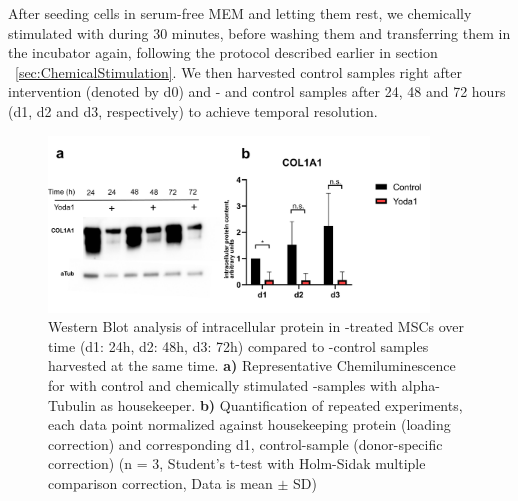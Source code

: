 After seeding cells in serum-free MEM\textalpha{} and letting them rest, we chemically stimulated \Piezo{} with \Yoda{} during 30 minutes, before washing them and transferring them in the incubator again, following the protocol described earlier in section ~\vref{sec:ChemicalStimulation}. We then harvested control samples right after intervention (denoted by d0) and \Yoda{}- and control samples after 24, 48 and 72 hours (d1, d2 and d3, respectively) to achieve temporal resolution. \par

\begin{figure}[htbp]
	\centering
	\includegraphics[width = 0.9\textwidth]{NormalYodaExp_WesternBlot_Col1a1.png}
	\caption{ Western Blot analysis of intracellular protein in \Yoda{}-treated MSCs over time (d1: 24h, d2: 48h, d3: 72h) compared to \Yoda{}-control samples harvested at the same time.
		\textbf{a)} Representative Chemiluminescence for \colone with control and chemically stimulated \Piezo{}-samples with alpha-Tubulin as housekeeper.
		\textbf{b)} Quantification of repeated experiments, each data point normalized against housekeeping protein (loading correction) and corresponding d1, control-sample (donor-specific correction) (n = 3, Student's t-test with Holm-Sidak multiple comparison correction, Data is mean $\pm$ SD)}
	\label{fig:Yoda_Norm_WB}
\end{figure}


